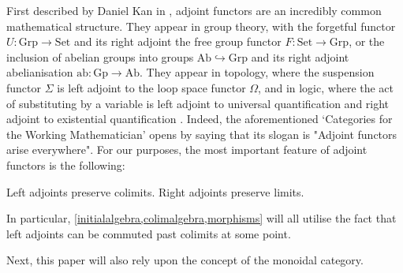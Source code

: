 First described by Daniel Kan in \cite{adjoint}, adjoint functors are an incredibly common mathematical structure. They appear in group theory, with the forgetful functor $U: \mathrm{Grp} \to \mathrm{Set}$ and its right adjoint the free group functor $F: \mathrm{Set} \to \mathrm{Grp}$, or the inclusion of abelian groups into groups $\mathrm{Ab} \hookrightarrow \mathrm{Grp}$ and its right adjoint abelianisation $\mathrm{ab}: \mathrm{Gp} \to \mathrm{Ab}$. They appear in topology, where the suspension functor $\Sigma$ is left adjoint to the loop space functor $\Omega$, and in logic, where the act of substituting by a variable is left adjoint to universal quantification and right adjoint to existential quantification \cite{aif}. Indeed, the aforementioned `Categories for the Working Mathematician' \cite{cwm} opens by saying that its slogan is "Adjoint functors arise everywhere". For our purposes, the most important feature of adjoint functors is the following:

\begin{prop} Left adjoints preserve colimits. Right adjoints preserve limits. \end{prop}

In particular, \cref{initialalgebra,colimalgebra,morphisms} will all utilise the fact that left adjoints can be commuted past colimits at some point.

Next, this paper will also rely upon the concept of the monoidal category.


